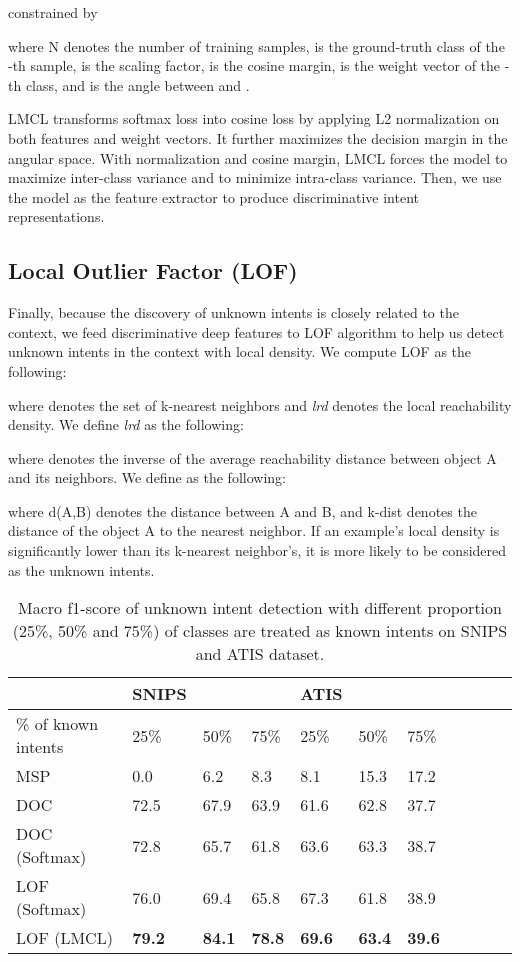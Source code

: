 \documentclass[11pt,a4paper]{article}
\begin{document}
constrained by  

where N denotes the number of training samples,  is the ground-truth class of the -th sample,  is the scaling factor,  is the cosine margin,  is the weight vector of the -th class, and  is the angle between  and .

LMCL transforms softmax loss into cosine loss by applying L2 normalization on both features and weight vectors. It further maximizes the decision margin in the angular space. With normalization and cosine margin, LMCL forces the model to maximize inter-class variance and to minimize intra-class variance. Then, we use the model as the feature extractor to produce discriminative intent representations.

\subsection{Local Outlier Factor (LOF)}
Finally, because the discovery of unknown intents is closely related to the context, we feed discriminative deep features  to LOF algorithm \cite{breunig2000lof} to help us detect unknown intents in the context with local density. We compute LOF as the following:

where  denotes the set of k-nearest neighbors and \emph{lrd} denotes the local reachability density. We define \emph{lrd} as the following:

where  denotes the inverse of the average reachability distance between object A and its neighbors. We define  as the following:

where d(A,B) denotes the distance between A and B, and k-dist denotes the distance of the object A to the  nearest neighbor. If an example's local density is significantly lower than its k-nearest neighbor's, it is more likely to be considered as the unknown intents. 
\begin{table*}[t!]
\centering
\begin{tabular}{lllllllllll}
   & SNIPS &   &  & ATIS &   &  & \\
\toprule
\% of known intents & 25\% & 50\% & 75\%  & 25\% & 50\% & 75\%  \\
  \hline
MSP & 0.0 & 6.2 & 8.3 & 8.1 & 15.3 & 17.2 \\
DOC & 72.5 & 67.9 & 63.9 & 61.6 & 62.8 & 37.7 \\
DOC (Softmax) & 72.8 & 65.7 & 61.8 & 63.6 & 63.3 & 38.7 \\
LOF (Softmax) & 76.0 & 69.4 & 65.8 & 67.3 & 61.8 & 38.9 \\
LOF (LMCL) & \textbf{79.2} & \textbf{84.1} & \textbf{78.8} & \textbf{69.6} & \textbf{63.4} & \textbf{39.6} \\
\bottomrule
\end{tabular}
\caption{ \label{result-table}  Macro f1-score of unknown intent detection with different proportion (25\%, 50\% and 75\%) of classes are treated as known intents on SNIPS and ATIS dataset.}
\end{table*}
\end{document}

